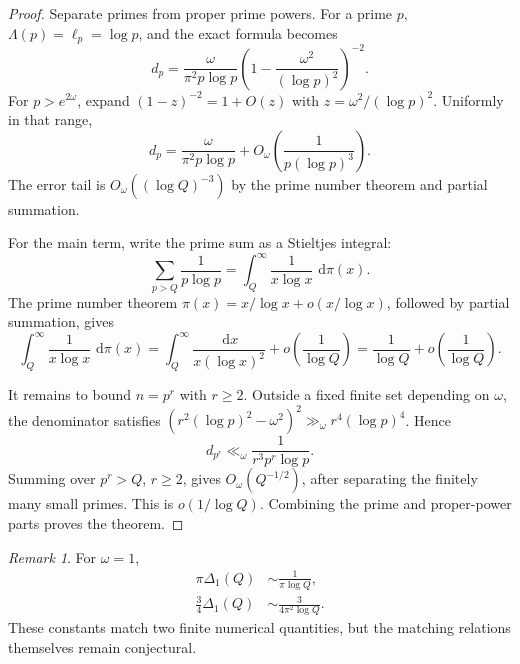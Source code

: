 \documentclass[11pt]{amsart}
\numberwithin{equation}{section}
\theoremstyle{plain}
\theoremstyle{definition}
\theoremstyle{remark}
\newtheorem{remark}[theorem]{Remark}
\newcommand{\1}{\mathbf{1}}
\newcommand{\dd}{\,\mathrm{d}}
\begin{document}
\begin{proof}
Separate primes from proper prime powers.  For a prime \(p\),
\(\Lambda(p)=\ell_p=\log p\), and the exact formula becomes
\begin{equation}
d_p
=
\frac{\omega}{\pi^2p\log p}
\left(1-\frac{\omega^2}{(\log p)^2}\right)^{-2}.
\label{eq:Delta_dp_exact_proof}
\end{equation}
For \(p>e^{2\omega}\), expand \((1-z)^{-2}=1+O(z)\) with
\(z=\omega^2/(\log p)^2\).  Uniformly in that range,
\begin{equation}
d_p
=
\frac{\omega}{\pi^2p\log p}
+
O_\omega\left(\frac1{p(\log p)^3}\right).
\label{eq:Delta_dp_error_proof}
\end{equation}
The error tail is \(O_\omega((\log Q)^{-3})\) by the prime number theorem
and partial summation.

For the main term, write the prime sum as a Stieltjes integral:
\begin{equation}
\sum_{p>Q}\frac1{p\log p}
=
\int_Q^\infty\frac1{x\log x}\,\dd\pi(x).
\label{eq:Delta_stieltjes_prime}
\end{equation}
The prime number theorem \(\pi(x)=x/\log x+o(x/\log x)\), followed by
partial summation, gives
\begin{equation}
\int_Q^\infty\frac1{x\log x}\,\dd\pi(x)
=
\int_Q^\infty\frac{\dd x}{x(\log x)^2}
+
o\left(\frac1{\log Q}\right)
=
\frac1{\log Q}+o\left(\frac1{\log Q}\right).
\label{eq:Delta_prime_main_proof}
\end{equation}

It remains to bound \(n=p^r\) with \(r\geq2\).  Outside a fixed finite
set depending on \(\omega\), the denominator satisfies
\((r^2(\log p)^2-\omega^2)^2\gg_\omega r^4(\log p)^4\).  Hence
\begin{equation}
d_{p^r}
\ll_\omega
\frac1{r^3p^r\log p}.
\label{eq:Delta_proper_power_bound}
\end{equation}
Summing over \(p^r>Q\), \(r\geq2\), gives
\(O_\omega(Q^{-1/2})\), after separating the finitely many small primes.
This is \(o(1/\log Q)\).  Combining the prime and proper-power parts
proves the theorem.
\end{proof}

\begin{remark}
\label{rem:Delta_scale}
For \(\omega=1\),
\begin{align}
\pi\Delta_1(Q)
&\sim
\frac1{\pi\log Q},
\label{eq:pi_Delta_scale}
\\
\frac34\Delta_1(Q)
&\sim
\frac3{4\pi^2\log Q}.
\label{eq:three_quarter_Delta_scale}
\end{align}
These constants match two finite numerical quantities, but the matching
relations themselves remain conjectural.
\end{remark}
\end{document}

